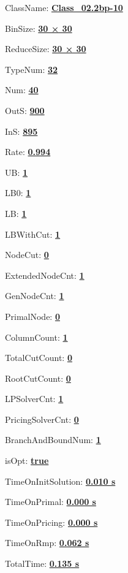 \documentclass[11pt]{article}
\begin{document}
\pagestyle{empty}


ClassName: \underline{\textbf{Class_02.2bp-10}}
\par
BinSize: \underline{\textbf{30 × 30}}
\par
ReduceSize: \underline{\textbf{30 × 30}}
\par
TypeNum: \underline{\textbf{32}}
\par
Num: \underline{\textbf{40}}
\par
OutS: \underline{\textbf{900}}
\par
InS: \underline{\textbf{895}}
\par
Rate: \underline{\textbf{0.994}}
\par
UB: \underline{\textbf{1}}
\par
LB0: \underline{\textbf{1}}
\par
LB: \underline{\textbf{1}}
\par
LBWithCut: \underline{\textbf{1}}
\par
NodeCut: \underline{\textbf{0}}
\par
ExtendedNodeCnt: \underline{\textbf{1}}
\par
GenNodeCnt: \underline{\textbf{1}}
\par
PrimalNode: \underline{\textbf{0}}
\par
ColumnCount: \underline{\textbf{1}}
\par
TotalCutCount: \underline{\textbf{0}}
\par
RootCutCount: \underline{\textbf{0}}
\par
LPSolverCnt: \underline{\textbf{1}}
\par
PricingSolverCnt: \underline{\textbf{0}}
\par
BranchAndBoundNum: \underline{\textbf{1}}
\par
isOpt: \underline{\textbf{true}}
\par
TimeOnInitSolution: \underline{\textbf{0.010 s}}
\par
TimeOnPrimal: \underline{\textbf{0.000 s}}
\par
TimeOnPricing: \underline{\textbf{0.000 s}}
\par
TimeOnRmp: \underline{\textbf{0.062 s}}
\par
TotalTime: \underline{\textbf{0.135 s}}
\par
\newpage
\end{document}
